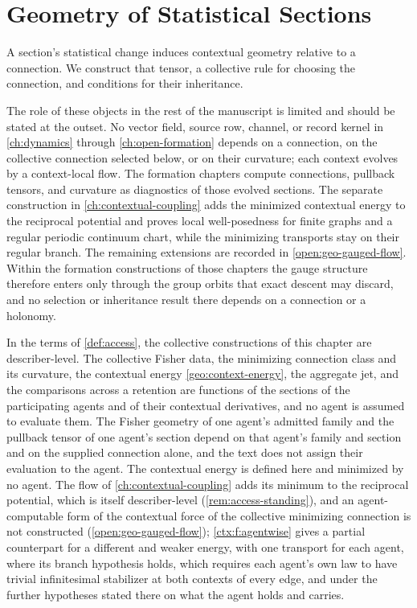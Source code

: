 \chapter{Geometry of Statistical Sections}
\label{ch:geometry}

A section's statistical change induces contextual geometry relative to a connection. We construct that tensor, a collective rule for choosing the connection, and conditions for their inheritance.

The role of these objects in the rest of the manuscript is limited and should be stated at the outset. No vector field, source row, channel, or record kernel in \cref{ch:dynamics} through \cref{ch:open-formation} depends on a connection, on the collective connection selected below, or on their curvature; each context evolves by a context-local flow. The formation chapters compute connections, pullback tensors, and curvature as diagnostics of those evolved sections. The separate construction in \cref{ch:contextual-coupling} adds the minimized contextual energy to the reciprocal potential and proves local well-posedness for finite graphs and a regular periodic continuum chart, while the minimizing transports stay on their regular branch. The remaining extensions are recorded in \cref{open:geo-gauged-flow}. Within the formation constructions of those chapters the gauge structure therefore enters only through the group orbits that exact descent may discard, and no selection or inheritance result there depends on a connection or a holonomy.

In the terms of \cref{def:access}, the collective constructions of this chapter are describer-level. The collective Fisher data, the minimizing connection class and its curvature, the contextual energy \cref{geo:context-energy}, the aggregate jet, and the comparisons across a retention are functions of the sections of the participating agents and of their contextual derivatives, and no agent is assumed to evaluate them. The Fisher geometry of one agent's admitted family and the pullback tensor of one agent's section depend on that agent's family and section and on the supplied connection alone, and the text does not assign their evaluation to the agent. The contextual energy is defined here and minimized by no agent. The flow of \cref{ch:contextual-coupling} adds its minimum to the reciprocal potential, which is itself describer-level (\cref{rem:access-standing}), and an agent-computable form of the contextual force of the collective minimizing connection is not constructed (\cref{open:geo-gauged-flow}); \cref{ctx:f:agentwise} gives a partial counterpart for a different and weaker energy, with one transport for each agent, where its branch hypothesis holds, which requires each agent's own law to have trivial infinitesimal stabilizer at both contexts of every edge, and under the further hypotheses stated there on what the agent holds and carries.

